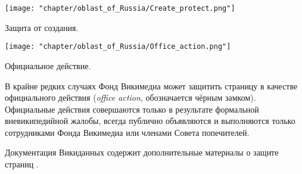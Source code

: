\begin{marginfigure}[0.0cm]
{
	\setlength{\fboxsep}{0pt}%
	\setlength{\fboxrule}{1pt}%
	{\texttt{[image: "chapter/oblast\_of\_Russia/Create\_protect.png"]}}
}
\caption [Иконка. Защита от создания.]{Защита от создания.}%
\label{fig:legend_population}%
\end{marginfigure}

\begin{marginfigure}[0.0cm]
{
	\setlength{\fboxsep}{0pt}%
	\setlength{\fboxrule}{1pt}%
	{\texttt{[image: "chapter/oblast\_of\_Russia/Office\_action.png"]}}
}
\caption [Иконка. Официальное действие.]{Официальное действие.}%
\label{fig:legend_population}%
\end{marginfigure}

В крайне редких случаях Фонд Викимедиа может защитить страницу в качестве официального действия (\textit{office action}, обозначается чёрным замком). Официальные действия совершаются только в результате формальной вневикипедийной жалобы, всегда публично объявляются и выполняются только сотрудниками Фонда Викимедиа или членами Совета попечителей.

Документация Викиданных содержит дополнительные материалы о защите страниц\protect\footnotemark
{}.
